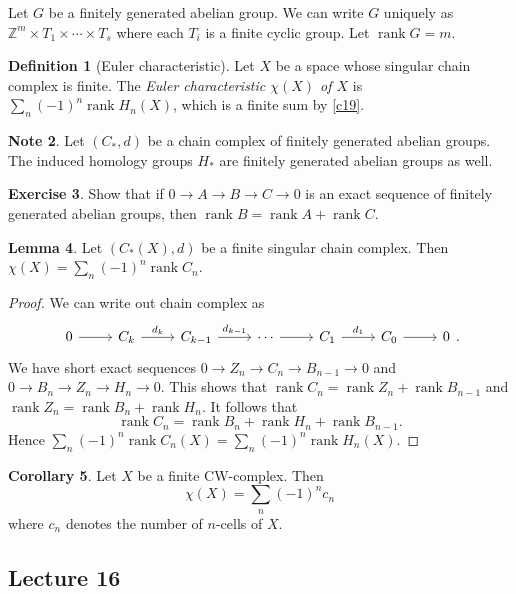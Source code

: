 \documentclass[10pt,letterpaper,cm]{nupset}
\theoremstyle{definition}
\newtheorem{definition}{Definition}[subsection]
\newtheorem{note}[definition]{Note}
\theoremstyle{theorem}
\newtheorem{lemma}[definition]{Lemma}
\newtheorem{corollary}[definition]{Corollary}
\newtheorem{exercise}[definition]{Exercise}
\theoremstyle{remark}
\newcommand{\Z}{\mathbb Z}
\newcommand{\1}{\mathbb{1}}
\newcommand{\0}{\vec 0}
\DeclareMathOperator{\rnk}{rank}
\begin{document}
\smallskip

Let $G$ be a finitely generated abelian group. We can write $G$ uniquely as  $\Z^m \times T_1 \times \cdots \times T_s$ where each $T_i$ is a  finite cyclic group. Let $\rnk{G} = m$.

\begin{definition}[Euler characteristic]
 Let $X$ be a space whose singular chain complex is finite. The \textit{Euler characteristic $\chi(X)$ of $X$} is $ \sum_n({-1})^n\rnk{H_n(X)}$, which is a finite sum by \cref{c19}.
\end{definition}

\begin{note}
Let $(C_{\ast}, d)$ be a chain complex of finitely generated abelian groups. The induced homology groups $H_{\ast}$ are finitely generated abelian groups as well. 
\end{note}

\begin{exercise}
Show that if $0 \to A \to B \to C \to 0$ is an exact sequence of finitely generated abelian groups, then $\rnk{B}= \rnk{A} + \rnk{C}$.
\end{exercise}

\begin{lemma}
Let $(C_{\ast}(X), d)$ be a finite singular chain complex. Then $\chi(X) =\sum_n ({-1})^n\rnk{C_n}$.
\end{lemma}
\begin{proof}
We can write out chain complex as
\[\begin{tikzcd}
0 \arrow[r] & C_k \arrow[r, "d_k"] & C_{k-1} \arrow[r, "d_{k-1}"] & \cdots \arrow[r] & C_1 \arrow[r, "d_1"] & C_0 \arrow[r] & 0
\end{tikzcd}
.\] We have short exact sequences $0 \to Z_n \to C_n \to B_{n-1} \to 0$ and $0 \to B_n \to Z_n \to H_n \to 0$. This shows that $\rnk{C_n}= \rnk{Z_n} +\rnk{B_{n-1}}$ and $\rnk{Z_n} = \rnk{B_n} + \rnk{H_n}$. It follows that $$\rnk{C_n}=  \rnk{B_n} + \rnk{H_n}  +\rnk{B_{n-1}}  .  $$ Hence $ \sum_n({-1})^n\rnk{C_n(X)} =  \sum_n({-1})^n\rnk{H_n(X)}$.
\end{proof}

\begin{corollary}
 Let $X$ be a finite CW-complex. Then $$\chi(X) = \sum_{n} ({-1})^nc_n$$ where $c_n$ denotes the number of $n$-cells of $X$.
\end{corollary}

\subsection{Lecture 16}
\end{document}

